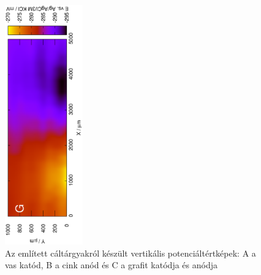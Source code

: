 \begin{figure}
\includegraphics[width=0.3\textwidth, angle=-90]{img/mérések/grafit_v.eps}


\caption{Az említett cáltárgyakról készült vertikális potenciáltértképek:
A a vas katód, B a cink anód és C a grafit katódja és anódja}
\label{fig:vertikális}
\end{figure}
